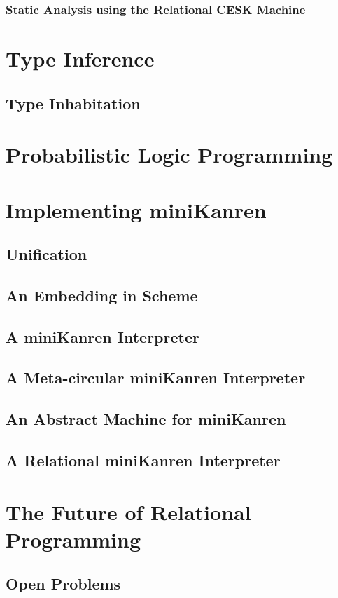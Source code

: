\documentclass[11pt]{book}
\begin{document}
\begin{schemeregion}
\subsection{Static Analysis using the Relational CESK Machine}

\chapter{Type Inference}
\section{Type Inhabitation}

\chapter{Probabilistic Logic Programming}

\chapter{Implementing miniKanren}
\section{Unification}
\section{An Embedding in Scheme}
\section{A miniKanren Interpreter}
\section{A Meta-circular miniKanren Interpreter}
\section{An Abstract Machine for miniKanren}
\section{A Relational miniKanren Interpreter}

\chapter{The Future of Relational Programming}
\section{Open Problems}

\end{schemeregion}
\end{document}
